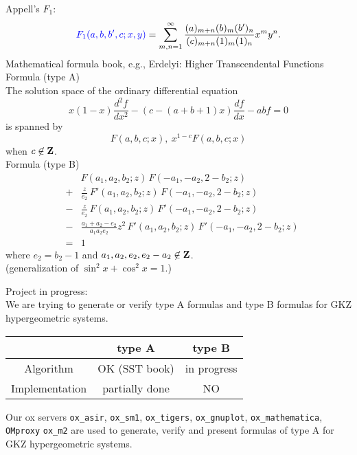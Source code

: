\documentclass{slides}
\begin{document}
\noindent
Appell's $F_1$:
$$ {\color{blue} F_1(a,b,b',c;x,y)} = \sum_{m,n=1}^\infty
  \frac{(a)_{m+n} (b)_m (b')_n}{(c)_{m+n}(1)_m (1)_n} x^m y^n.
$$
\newpage
Mathematical formula book, e.g.,
Erdelyi: {\color{green} Higher Transcendental Functions} \\
{\color{blue} Formula (type A)}\\
The solution space of the ordinary differential equation
$$ x(1-x) \frac{d^2f}{dx^2} -\left( c-(a+b+1)x \right) \frac{df}{dx} - a b f = 0$$
is spanned by
$$ F(a,b,c;x) , \  x^{1-c} F(a,b,c;x) $$
when $c \not\in {\bf Z}$. \\
{\color{blue} Formula (type B)}\\
\begin{eqnarray*}
&\ & F(a_1, a_2, b_2;z) \, F(-a_1,-a_2,2-b_2;z)  \\
&+& \frac{z}{e_2}\, F'(a_1, a_2, b_2;z) \, F(-a_1,-a_2,2-b_2;z)  \\
&-& \frac{z}{e_2}\, F(a_1, a_2, b_2;z) \, F'(-a_1,-a_2,2-b_2;z)  \\
&-& \frac{a_1+a_2-e_2}{a_1 a_2 e_2}z^2\,
  F'(a_1, a_2, b_2;z)\,F'(-a_1,-a_2,2-b_2;z) \\
&=& 1
\end{eqnarray*}
where $e_2 = b_2-1$ and $a_1, a_2, e_2, e_2-a_2 \not\in {\bf Z}$.  \\
(generalization of $\sin^2 x + \cos^2 x =1$.)

\noindent
Project in progress: \\
We are trying to generate or verify type A formulas and type B formulas
for {\color{blue} GKZ hypergeometric systems}.

\begin{tabular}{|c|c|c|}
\hline
  & type A & type B \\ \hline
Algorithm &  {\color{red} OK} (SST book) &  in progress \\ \hline
Implementation & partially done & NO \\ \hline
\end{tabular}

\noindent
Our ox servers
{\tt ox\_asir}, {\tt ox\_sm1}, {\tt ox\_tigers}, {\tt ox\_gnuplot},
{\tt ox\_mathematica}, {\tt OMproxy} {\tt ox\_m2}
are used to generate, verify and present formulas of type A
for GKZ hypergeometric systems.
\end{document}
